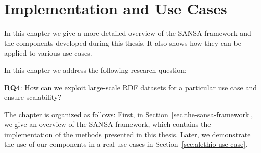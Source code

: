 \chapter{Implementation and Use Cases}
\label{chapter:implementation_and_use_cases}
In this chapter we give a more detailed overview of the SANSA framework and the components developed during this thesis.
It also shows how they can be applied to various use cases.

In this chapter we address the following research question:

\begin{tcolorbox}
\textbf{RQ4}: How can we exploit large-scale \gls{RDF} datasets for a particular use case and ensure scalability?
\end{tcolorbox}

The chapter is organized as follows: First, in Section~\ref{sec:the-sansa-framework}, we give an overview of the SANSA framework, which contains the implementation of the methods presented in this thesis.
Later, we demonstrate the use of our components in a real use cases in Section~\ref{sec:alethio-use-case}.

